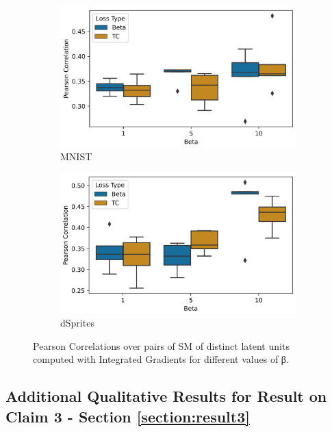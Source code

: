\begin{figure}[h!]
\centering
\begin{subfigure}[b]{0.4\linewidth}
\includegraphics[width=\textwidth]{images/vae/metric_box_plots_mnist_ig.PNG}
\caption{MNIST}\label{fig:metric_box_plots_mnist_ig}
\end{subfigure}
\begin{subfigure}[b]{0.4\linewidth}
\includegraphics[width=\textwidth]{images/vae/metric_box_plots_dSprites_ig.PNG} 
\caption{dSprites}\label{fig:metric_box_plots_dSprites_ig}
\end{subfigure}
\caption{Pearson Correlations over pairs of SM of distinct latent units computed with Integrated Gradients for different values of β.}\label{fig:metrics_plots_extra}
\end{figure}

\newpage
\subsection{Additional Qualitative Results for Result on Claim 3 - Section \ref{section:result3}}

